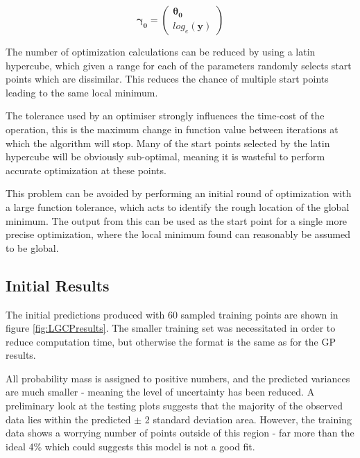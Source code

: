 \documentclass[a4paper,11pt]{report}
\begin{document}
\begin{equation} \label{eq:LGCPstartpoint}
\boldsymbol{\gamma_0} = \left( \begin{array}{cc}
\boldsymbol{\theta_0} \\
log_e(\mathbf{y}) \end{array} \right) 
\end{equation}

The number of optimization calculations can be reduced by using a latin hypercube, which given a range for each of the parameters randomly selects start points which are dissimilar. This reduces the chance of multiple start points leading to the same local minimum. \par

The tolerance used by an optimiser strongly influences the time-cost of the operation, this is the maximum change in function value between iterations at which the algorithm will stop. Many of the start points selected by the latin hypercube will be obviously sub-optimal, meaning it is wasteful to perform accurate optimization at these points. \par

This problem can be avoided by performing an initial round of optimization with a large function tolerance, which acts to identify the rough location of the global minimum. The output from this can be used as the start point for a single more precise optimization, where the local minimum found can reasonably be assumed to be global.


\subsection{Initial Results}

The initial predictions produced with 60 sampled training points are shown in figure \ref{fig:LGCPresults}. The smaller training set was necessitated in order to reduce computation time, but otherwise the format is the same as for the GP results. \par

All probability mass is assigned to positive numbers, and the predicted variances are much smaller - meaning the level of uncertainty has been reduced. A preliminary look at the testing plots suggests that the majority of the observed  data lies within the predicted \(\pm\) 2 standard deviation area. However, the training data shows a worrying number of points outside of this region - far more than the ideal 4\% which could suggests this model is not a good fit. 
\end{document}
